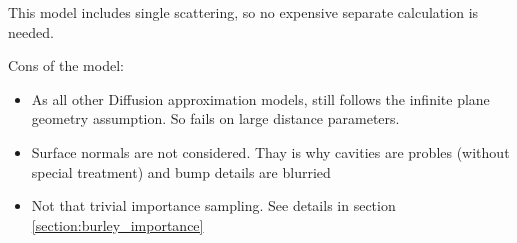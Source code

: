 This model includes single scattering, so no expensive separate
calculation is needed.

Cons of the model:
\begin{itemize}
  \item {As all other Diffusion approximation models, still follows the infinite
  plane geometry assumption. So fails on large distance parameters. }
  \item {Surface normals are not considered. Thay is why cavities are probles
  (without special treatment) and bump details are blurried}
  \item{Not that trivial importance sampling. See details in section
  \ref{section:burley_importance}}
\end{itemize}